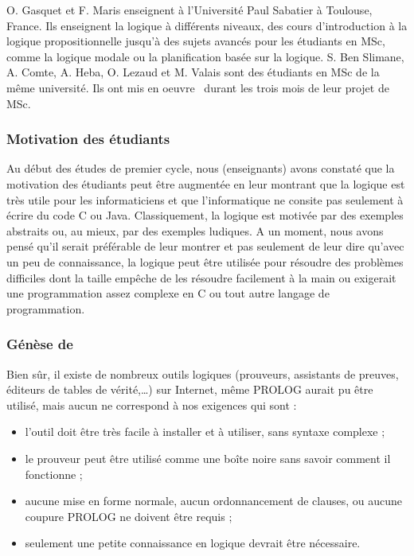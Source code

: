 O. Gasquet et F. Maris enseignent \`a l'Universit\'e Paul Sabatier \`a Toulouse, France. Ils enseignent la logique \`a diff\'erents niveaux, des cours d'introduction \`a la logique propositionnelle jusqu'\`a des sujets avanc\'es pour les \'etudiants en MSc, comme la logique modale ou la planification bas\'ee sur la logique. S. Ben Slimane, A. Comte, A. Heba, O. Lezaud et M. Valais sont des \'etudiants en MSc de la m\^eme universit\'e. Ils ont mis en oeuvre \nameTool\ durant les trois mois de leur projet de MSc.

\subsubsection*{Motivation des \'etudiants}
Au d\'ebut des \'etudes de premier cycle, nous (enseignants) avons constat\'e que la motivation des \'etudiants peut \^etre augment\'ee en leur montrant que la logique est tr\`es utile pour les informaticiens et que l'informatique ne consite pas seulement \`a \'ecrire du code C ou Java. Classiquement, la logique est motiv\'ee par des exemples abstraits ou, au mieux, par des exemples ludiques. A un moment, nous avons pens\'e qu'il serait pr\'ef\'erable de leur montrer et pas seulement de leur dire qu'avec un peu de connaissance, la logique peut \^etre utilis\'ee pour r\'esoudre des probl\`emes difficiles dont la taille emp\^eche de les r\'esoudre facilement \`a la main ou exigerait une programmation assez complexe en C ou tout autre langage de programmation. \\

\subsubsection*{G\'en\`ese de \satoulouse}
Bien s\^ur, il existe de nombreux outils logiques (prouveurs, assistants de preuves, \'editeurs de tables de v\'erit\'e,\ldots) sur Internet, m\^eme PROLOG aurait pu \^etre utilis\'e, mais aucun ne correspond \`a nos exigences qui sont :
\begin{itemize}
\item l'outil doit \^etre tr\`es facile \`a installer et \`a utiliser, sans syntaxe complexe ;
\item le prouveur peut \^etre utilis\'e comme une bo\^ite noire sans savoir comment il fonctionne ;
\item  aucune mise en forme normale,  aucun ordonnancement de clauses, ou aucune coupure PROLOG ne doivent \^etre requis ;
\item seulement une petite connaissance en logique devrait \^etre n\'ecessaire.
\end{itemize} 

